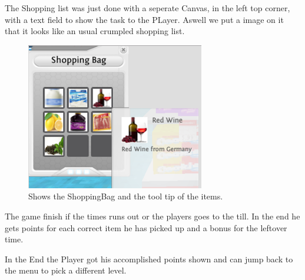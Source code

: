 \documentclass{acm_proc_article-sp}
\begin{document}
The Shopping list was just done with a seperate Canvas, in the left top corner, with a text field to show the task to the PLayer. Aswell we put a image on it that it looks like an usual crumpled shopping list. 

\begin{figure}
    \centering
    \includegraphics[width=\columnwidth]{ShoppingBag.png}
    \caption{Shows the ShoppingBag and the tool tip of the items.}
    \label{fig:ShoppingBag}
\end{figure}

The game finish if the times runs out or the players goes to the till. In the end he gets points for each correct item he has picked up and a bonus for the leftover time.

In the End the Player got his accomplished points shown and can jump back to the menu to pick a different level. 



\end{document}
